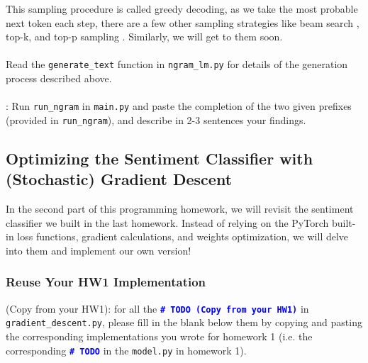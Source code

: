 This sampling procedure is called greedy decoding, as we take the most probable next token each step, there are a few other sampling strategies like beam search \citep{meisteretal2020beam}, top-k, and top-p sampling \citep{holtzman2019curious}. Similarly, we will get to them soon.
\\\\
\noindent Read the \texttt{generate\_text} function in \texttt{ngram\_lm.py} for details of the generation process described above.
\\\\
\noindent \todo{}: Run \texttt{run\_ngram} in \texttt{main.py} and paste the completion of the two given prefixes (provided in \texttt{run\_ngram}), and describe in 2-3 sentences your findings.
\\

\subsection{Optimizing the Sentiment Classifier with (Stochastic) Gradient Descent}
In the second part of this programming homework, we will revisit the sentiment classifier we built in the last homework. Instead of relying on the PyTorch built-in loss functions, gradient calculations, and weights optimization, we will delve into them and implement our own version!

\subsubsection{Reuse Your HW1 Implementation}
\todo{} (Copy from your HW1): for all the \textcolor{blue}{\texttt{\textbf{\#~TODO (Copy from your HW1)}}} in \texttt{gradient\_descent.py}, please fill in the blank below them by copying and pasting the corresponding implementations you wrote for homework 1 (i.e. the corresponding \textcolor{blue}{\texttt{\textbf{\#~TODO}}} in the \texttt{model.py} in homework 1).

